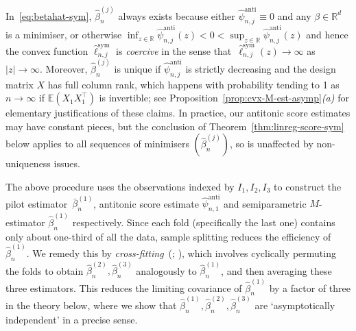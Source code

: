 \documentclass[a4paper]{article}
\newcommand{\R}{\mathbb{R}}
\newcommand{\E}{\mathbb{E}}
\theoremstyle{definition}
\begin{document}
In~\eqref{eq:betahat-sym}, $\hat{\beta}_n^{(j)}$ always exists because either $\hat{\psi}_{n,j}^{\mathrm{anti}} \equiv 0$ and any $\beta \in \R^d$ is a minimiser, or otherwise $\inf_{z \in \R}\hat{\psi}_{n,j}^{\mathrm{anti}}(z) < 0 < \sup_{z \in \R}\hat{\psi}_{n,j}^{\mathrm{anti}}(z)$ and hence the convex function $\hat{\ell}_{n,j}^{\mathrm{sym}}$ is \emph{coercive} in the sense that~$\hat{\ell}_{n,j}^{\mathrm{sym}}(z) \to \infty$ as $|z| \to \infty$. Moreover, $\hat{\beta}_n^{(j)}$ is unique if $\hat{\psi}_{n,j}^{\mathrm{anti}}$ is strictly decreasing and the design matrix $X$ has full column rank, which happens with probability tending to 1 as $n \to \infty$ if $\E(X_1 X_1^\top)$ is invertible; see Proposition~\ref{prop:cvx-M-est-asymp}\textit{(a)} for elementary justifications of these claims. In practice, our antitonic score estimates may have constant pieces, but the conclusion of Theorem~\ref{thm:linreg-score-sym} below applies to all sequences of minimisers $(\hat{\beta}_n^{(j)})$, so is unaffected by non-uniqueness issues.

The above procedure uses the observations indexed by $I_1,I_2,I_3$ to construct the pilot estimator~$\bar{\beta}_n^{(1)}$, antitonic score estimate $\hat{\psi}_{n,1}^{\mathrm{anti}}$ and semiparametric $M$-estimator $\hat{\beta}_n^{(1)}$ respectively. Since each fold (specifically the last one) contains only about one-third of all the data, sample splitting reduces the efficiency of $\hat{\beta}_n^{(1)}$. We remedy this by \textit{cross-fitting}~(\citealp[p.~393]{vdV1998asymptotic}; \citealp[Section~3]{chernozhukov2018double}), which involves cyclically permuting the folds to obtain $\hat{\beta}_n^{(2)},\hat{\beta}_n^{(3)}$ analogously to $\hat{\beta}_n^{(1)}$, and then averaging these three estimators. This reduces the limiting covariance of $\hat{\beta}_n^{(1)}$ by a factor of three in the theory below, where we show that $\hat{\beta}_n^{(1)},\hat{\beta}_n^{(2)},\hat{\beta}_n^{(3)}$ are `asymptotically independent' in a precise sense. 
\end{document}
